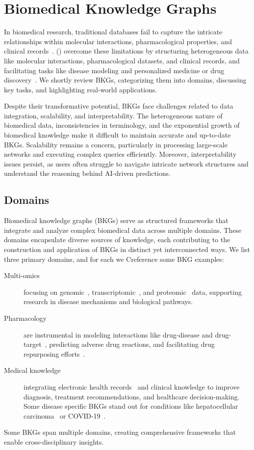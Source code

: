 \section{Biomedical Knowledge Graphs}\label{kgs:biomed}
In biomedical research, traditional databases fail to capture the intricate relationships within molecular interactions, pharmacological properties, and clinical records~\cite{Callahan2020KBDS}\cite{Su2020NetworkEmbeddingBiomedicalbDS}.  () overcome these limitations by structuring heterogeneous data like molecular interactions, pharmacological datasets, and clinical records, and facilitating tasks like disease modeling and personalized medicine or drug discovery~\cite{Lu2025BiomedicalKG}. We shortly review BKGs, categorizing them into domains, discussing key tasks, and  highlighting real-world applications.

Despite their transformative potential, BKGs face challenges related to data integration, scalability, and interpretability. The heterogeneous nature of biomedical data, inconsistencies in terminology, and the exponential growth of biomedical knowledge make it difficult to maintain accurate and up-to-date BKGs. Scalability remains a concern, particularly in processing large-scale networks and executing complex queries efficiently. Moreover, interpretability issues persist, as users often struggle to navigate intricate network structures and understand the reasoning behind AI-driven predictions.

\subsection{Domains}
Biomedical knowledge graphs (BKGs) serve as structured frameworks that integrate and analyze complex biomedical data across multiple domains. These domains encapsulate diverse sources of knowledge, each contributing to the construction and application of BKGs in distinct yet interconnected ways. We list three primary domains, and for each we Creference some BKG examples:
\begin{description}
    \item[Multi-omics] focusing on genomic~\cite{Jha2019genomicsKG}, transcriptomic~\cite{CavalleriEmanuele2024Aokg}, and proteomic~\cite{Zhang2022ontoprotein} data, supporting research in disease mechanisms and biological pathways.
    \item[Pharmacology] are instrumental in modeling interactions like drug-disease and drug-target~\cite{Gonzalez2023drugmechdb}, predicting adverse drug reactions, and facilitating drug repurposing efforts~\cite{Huang2024foundationModelDrugRepurposing}.
    \item[Medical knowledge] integrating electronic health records~\cite{Shang2021ehr} and clinical knowledge to improve diagnosis, treatment recommendations, and healthcare decision-making. Some disease specific BKGs stand out for conditions like hepatocellular carcinoma~\cite{Li2020kghc} or COVID-19~\cite{Zheng2021multiModalKGCOVID19}.
\end{description}
Some BKGs span multiple domains, creating comprehensive frameworks that enable cross-disciplinary insights.

